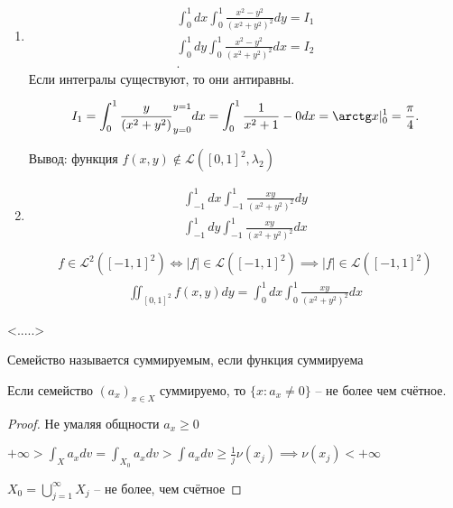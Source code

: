 \begin{example}
    \begin{enumerate}
        \item 
            \begin{align*}
                \int_0^1dx\int_0^1 \frac{x^2-y^2}{\left( x^2+y^2 \right) ^2}dy = I_1\\
                \int_0^1dy\int_0^1 \frac{x^2-y^2}{\left( x^2+y^2 \right) ^2}dx = I_2\\
            .\end{align*}
            Если интегралы существуют, то они антиравны.

             \begin{align*}
                 I_1 = \int_0^1 \frac{y}{\left( x^2+y^2 \right) }_{y = 0}^{y = 1}dx = \int_0^1 \frac{1}{x^2+1} - 0dx = \arctg x |_0^1 = \frac{\pi}{4}
            .\end{align*}

            Вывод: функция $f(x,y) \not\in \mathscr L\left( [0,1]^2, \lambda_2 \right) $
        \item 
            \begin{align*}
                \int _{-1}^1 dx\int_{-1}^1 \frac{xy}{\left( x^2+y^2 \right) ^2}dy\\
                \int _{-1}^1 dy\int_{-1}^1 \frac{xy}{\left( x^2+y^2 \right) ^2}dx\\
            \end{align*}
            \begin{align*}
                    f\in \mathscr {L}^2\left( [-1,1]^2 \right)  \iff |f|\in \mathscr{L} \left( [-1,1]^2 \right)  \implies |f|\in \mathscr{L} \left( [-1,1]^2 \right) 
            \end{align*}
            \begin{align*}
                    \iint _{[0,1]^2} f\left( x,y \right) dy = \int _0^1 dx \int _0^1 \frac{xy}{\left( x^2+y^2 \right) ^2}dx
            \end{align*}
    \end{enumerate}
\end{example}

<.....>

\begin{statement}
    Семейство называется суммируемым, если функция суммируема 
\end{statement}

\begin{statement}
    Если семейство $\left( a_x \right)_{x\in X} $ суммируемо, то $\{x: a_x \neq 0\}$ -- не более чем счётное.
\end{statement}
\begin{proof}
    Не умаляя общности $a_x \geqslant 0$

    $+\infty  > \int_X a_xdv = \int _{X_0}a_xdv > \int a_x dv \geqslant \frac{1}{j}\nu\left( x_j \right) \implies \nu(x_j) <+\infty  $ 

    $X_0 = \bigcup\limits_{j=1}^{\infty }X_j $ -- не более, чем счётное
\end{proof}

